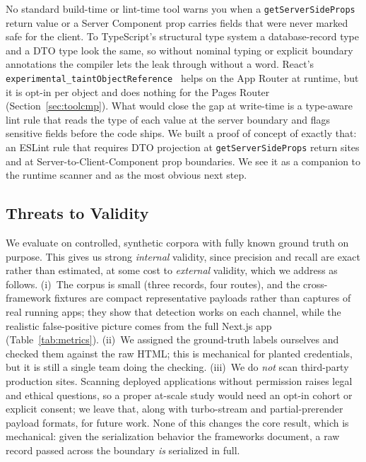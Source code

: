 \documentclass[runningheads]{llncs}
\begin{document}
No standard build-time or lint-time tool warns you when a
\texttt{getServerSideProps} return value or a Server Component prop
carries fields that were never marked safe for the client.  To
TypeScript's structural type system a database-record type and a DTO type
look the same, so without nominal typing or explicit boundary annotations
the compiler lets the leak through without a word.  React's
\texttt{experimental\_taintObjectReference}~\cite{react_taint} helps on
the App Router at runtime, but it is opt-in per object and does nothing for
the Pages Router (Section~\ref{sec:toolcmp}).  What would close the gap at
write-time is a type-aware lint rule that reads the type of each value at
the server boundary and flags sensitive fields before the code ships.  We
built a proof of concept of exactly that: an ESLint rule that requires DTO
projection at \texttt{getServerSideProps} return sites and at
Server-to-Client-Component prop boundaries.  We see it as a companion to
the runtime scanner and as the most obvious next step.

\subsection{Threats to Validity}

We evaluate on controlled, synthetic corpora with fully known ground
truth on purpose.  This gives us strong \emph{internal} validity, since
precision and recall are exact rather than estimated, at some cost to
\emph{external} validity, which we address as follows.  (i)~The corpus is
small (three records, four routes), and the cross-framework fixtures are
compact representative payloads rather than captures of real running apps;
they show that detection works on each channel, while the realistic
false-positive picture comes from the full Next.js app
(Table~\ref{tab:metrics}).  (ii)~We assigned the ground-truth labels
ourselves and checked them against the raw HTML; this is mechanical for
planted credentials, but it is still a single team doing the checking.
(iii)~We do \emph{not} scan third-party production sites.  Scanning
deployed applications without permission raises legal and ethical
questions, so a proper at-scale study would need an opt-in cohort or
explicit consent; we leave that, along with turbo-stream and
partial-prerender payload formats, for future work.  None of this changes
the core result, which is mechanical: given the serialization behavior the
frameworks document, a raw record passed across the boundary \emph{is}
serialized in full.
\end{document}

